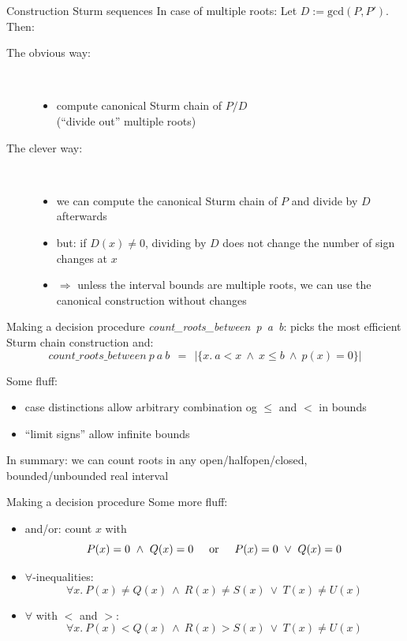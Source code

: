 \documentclass[%
	sans,			%
	mathsans,		%
	10pt,
	t		%
	slidescentered,%
]{beamer}
\begin{document}
\begin{frame}{Construction Sturm sequences}
In case of multiple roots: Let $D := \mathrm{gcd}(P,P')$. Then:\pause
\begin{description}
\item[The obvious way:]\ \\
\begin{itemize}
\item compute canonical Sturm chain of $P / D$\\ (\enquote{divide out} multiple roots)
\end{itemize}\pause
\item[The clever way:]\ \\
\begin{itemize}
\item we can compute the canonical Sturm chain of $P$ and divide by $D$ afterwards\pause
\item but: if $D(x)\neq 0$, dividing by $D$ does not change the number of sign changes at $x$\pause
\item $\Longrightarrow$ unless the interval bounds are multiple roots, we can use the canonical construction without changes
\end{itemize}
\end{description}
\end{frame}

\begin{frame}{Making a decision procedure}
\textit{count\_roots\_between\ p\ a\ b}: picks the most efficient Sturm chain construction and:
$$\textit{count\_roots\_between}\ p\ a\ b\ \ =\ \ |\{x.\ a < x\ \wedge\ x \leq b\ \wedge\ p(x) = 0\}|$$\vskip2mm
\pause

Some fluff:
\begin{itemize}
\item case distinctions allow arbitrary combination og $\leq$ and $<$ in bounds
\item \enquote{limit signs} allow infinite bounds
\end{itemize}
In summary: we can count roots in any open/halfopen/closed, bounded/unbounded real interval
\end{frame}

\begin{frame}{Making a decision procedure}
Some more fluff:
\begin{itemize}
\item and/or: count $x$ with $$P(x)=0\ \wedge\ Q(x)=0\hskip5mm\mathrm{or}\hskip5mm P(x)=0\ \vee\ Q(x)=0$$\pause
\item $\forall$-inequalities: $$\forall x.\ P(x) \neq Q(x)\ \wedge\ R(x) \neq S(x)\ \vee\ T(x)\neq U(x)$$\pause
\item $\forall$ with $<$ and $>$: $$\forall x.\ P(x) < Q(x)\ \wedge\ R(x) > S(x)\ \vee\ T(x)\neq U(x)$$
\end{itemize}
\end{frame}
\end{document}
